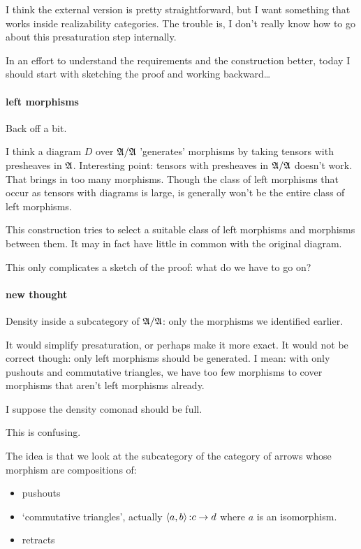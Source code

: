 \documentclass[csh.tex]{subfiles}
\begin{document}
I think the external version is pretty straightforward, but I want something that works inside realizability categories. The trouble is, I don't really know how to go about this presaturation step internally.

In an effort to understand the requirements and the construction better, today I should start with sketching the proof and working backward\dots

\paragraph{left morphisms}
Back off a bit.

I think a diagram $D$ over $\mathfrak A/\mathfrak A$ 'generates' morphisms by taking tensors with presheaves in $\mathfrak A$.  
Interesting point: tensors with presheaves in $\mathfrak A/\mathfrak A$ doesn't work. That brings in too many morphisms.
Though the class of left morphisms that occur as tensors with diagrams is large, is generally won't be the entire class of left morphisms. 

This construction tries to select a suitable class of left morphisms and morphisms between them.
It may in fact have little in common with the original diagram.

This only complicates a sketch of the proof: what do we have to go on?

\paragraph{new thought}
Density inside a subcategory of $\mathfrak A/\mathfrak A$: only the morphisms we identified earlier.

It would simplify presaturation, or perhaps make it more exact. It would not be correct though: only left morphisms should be generated. I mean: with only pushouts and commutative triangles, we have too few morphisms to cover morphisms that aren't left morphisms already.

I suppose the density comonad should be full.

This is confusing.

The idea is that we look at the subcategory of the category of arrows whose morphism are compositions of:
\begin{itemize}
\item pushouts
\item `commutative triangles', actually $\left\langle a,b \right\rangle\mathord : c\to d$ where $a$ is an isomorphism.
\item retracts
\end{itemize}
\end{document}
